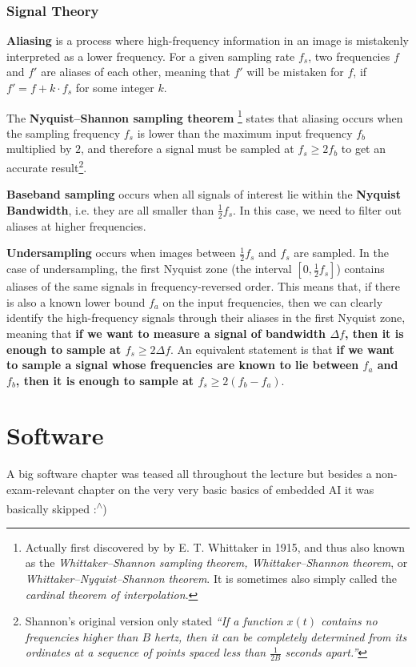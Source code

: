 \documentclass{report}
\newcommand{\tbf}{\textbf}
\newcommand*{\newpar}{\par\vspace{\baselineskip}\noindent} %
\begin{document}
\subsection{Signal Theory}
\tbf{Aliasing} is a process where high-frequency information in an image is mistakenly interpreted as a lower frequency. For a given sampling rate $f_s$, two frequencies $f$ and $f'$ are aliases of each other, meaning that $f'$ will be mistaken for $f$, if $f' = f + k \cdot f_s$ for some integer $k$.
\newpar
The \tbf{Nyquist–Shannon sampling theorem} \footnote{Actually first discovered by by E. T. Whittaker in 1915, and thus also known as the \textit{Whittaker–Shannon sampling theorem, Whittaker–Shannon theorem}, or \textit{Whittaker–Nyquist–Shannon theorem}. It is sometimes also simply called the \textit{cardinal theorem of interpolation}.} states that aliasing occurs when the sampling frequency $f_s$ is lower than the maximum input frequency $f_b$ multiplied by $2$, and therefore a signal must be sampled at $f_s \geq 2f_b$ to get an accurate result\footnote{Shannon's original version only stated \textit{``If a function $x(t)$ contains no frequencies higher than $B$ hertz, then it can be completely determined from its ordinates at a sequence of points spaced less than $\frac{1} {2B}$ seconds apart.''}}.
\newpar
\tbf{Baseband sampling} occurs when all signals of interest lie within the \tbf{Nyquist Bandwidth}, i.e. they are all smaller than $\frac{1}{2}f_s$. In this case, we need to filter out aliases at higher frequencies.
\newpar
\tbf{Undersampling} occurs when images between $\frac{1}{2}f_s$ and $f_s$ are sampled. In the case of undersampling, the first Nyquist zone (the interval $[0, \frac{1}{2}f_s]$) contains aliases of the same signals in frequency-reversed order. This means that, if there is also a known lower bound $f_a$ on the input frequencies, then we can clearly identify the high-frequency signals through their aliases in the first Nyquist zone, meaning that \tbf{if we want to measure a signal of bandwidth $\Delta f$, then it is enough to sample at $f_s \geq 2 \Delta f$}. An equivalent statement is that \tbf{if we want to sample a signal whose frequencies are known to lie between $f_a$ and $f_b$, then it is enough to sample at $f_s \geq 2(f_b - f_a)$}.
\chapter{Software}
\thispagestyle{fancy}
A big software chapter was teased all throughout the lecture but besides a non-exam-relevant chapter on the very very basic basics of embedded AI it was basically skipped :\textsuperscript{$\wedge$})
%
\appendix
\end{document}
